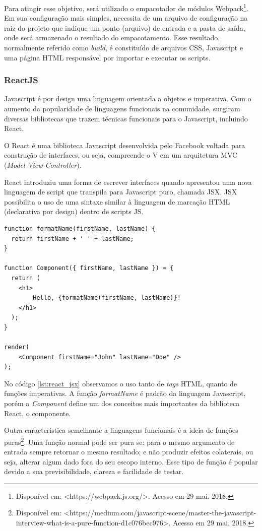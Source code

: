 Para atingir esse objetivo, será utilizado o empacotador de módulos Webpack\footnote{Disponível em: <https://webpack.js.org/>. Acesso em 29 mai. 2018.}. Em sua configuração mais simples, necessita de um arquivo de configuração na raiz do projeto que indique um ponto (arquivo) de entrada e a pasta de saída, onde será armazenado o resultado do empacotamento. Esse resultado, normalmente referido como \textit{build}, é constituído de arquivos CSS, Javascript e uma página HTML responsável por importar e executar os scripts.

\subsubsection{ReactJS}

Javascript é por design uma linguagem orientada a objetos e imperativa. Com o aumento da popularidade de linguagens funcionais na comunidade, surgiram diversas bibliotecas que trazem técnicas funcionais para o Javascript, incluindo React.

O React é uma biblioteca Javascript desenvolvida pelo Facebook voltada para construção de interfaces, ou seja, compreende o V em um arquitetura MVC (\textit{Model-View-Controller}).

React introduziu uma forma de escrever interfaces quando apresentou uma nova linguagem de script que transpila para Javascript puro, chamada JSX. JSX possibilita o uso de uma sintaxe similar à linguagem de marcação HTML (declarativa por design) dentro de scripts JS. 

\begin{lstlisting}[caption={Exemplo de componente escrito com JSX}, label={lst:react_jsx}]
function formatName(firstName, lastName) {
  return firstName + ' ' + lastName;
}

function Component({ firstName, lastName }) = {
  return (
  	<h1>
		Hello, {formatName(firstName, lastName)}!
  	</h1>
  );
}

render(
	<Component firstName="John" lastName="Doe" />
);
\end{lstlisting}

No código \ref{lst:react_jsx} observamos o uso tanto de \textit{tags} HTML, quanto de funções imperativas. A função \textit{formatName} é padrão da linguagem Javascript, porém a \textit{Component} define um dos conceitos mais importantes da biblioteca React, o componente.

Outra característica semelhante a linguagens funcionais é a ideia de funções puras\footnote{Disponível em: <https://medium.com/javascript-scene/master-the-javascript-interview-what-is-a-pure-function-d1c076bec976>. Acesso em 29 mai. 2018.}. Uma função normal pode ser pura se: para o mesmo argumento de entrada sempre retornar o mesmo resultado; e não produzir efeitos colaterais, ou seja, alterar algum dado fora do seu escopo interno. Esse tipo de função é popular devido a sua previsibilidade, clareza e facilidade de testar.

